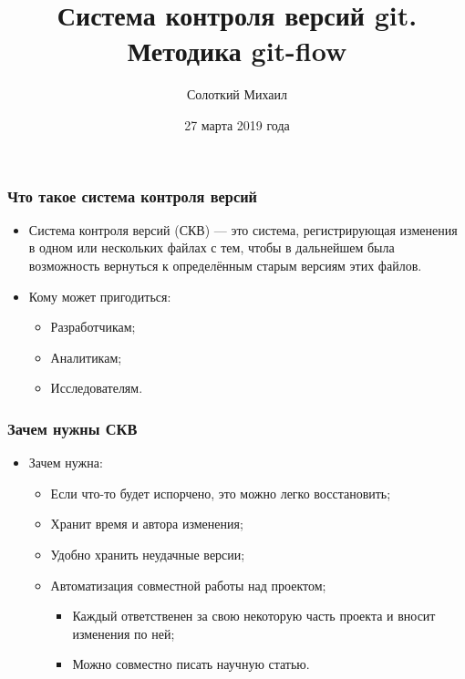 \documentclass[]{beamer}
\title[Git]{\bfseries Система контроля версий git. Методика git-flow}
\author[Cолоткий~М.]{Солоткий Михаил}
\institute[ВМК МГУ]{МГУ имени М. В. Ломоносова, факультет ВМК, кафедра ММП}
\date{27 марта 2019 года}
\begin{document}

\begin{frame}
	\titlepage
\end{frame}

\begin{frame} \frametitle{Что такое система контроля версий}
	\begin{itemize}
		\item Система контроля версий (СКВ) — это система, регистрирующая изменения в одном или нескольких файлах с тем, чтобы в дальнейшем была возможность вернуться к определённым старым версиям этих файлов. \newline \par

		\item Кому может пригодиться:
		\begin{itemize}
		    \item Разработчикам;
		    \item Аналитикам;
		    \item Исследователям.
		\end{itemize}
	\end{itemize}
\end{frame}

\begin{frame} \frametitle{Зачем нужны СКВ}
\begin{itemize}
		\item Зачем нужна:
		\begin{itemize}
		    \item Если что-то будет испорчено, это можно легко восстановить;
             \item Хранит время и автора изменения;
		    \item Удобно хранить неудачные версии;
		    \item Автоматизация совместной работы над проектом;
		    \begin{itemize}
		        \item Каждый ответственен за свою некоторую часть проекта и вносит изменения по ней;
		        \item Можно совместно писать научную статью.
		    \end{itemize}
		\end{itemize}
\end{itemize}
\end{frame}
\end{document}
